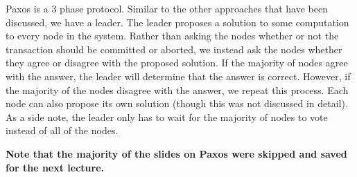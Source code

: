 \documentclass[twoside]{article}
\begin{document}
Paxos is a $3$ phase protocol. Similar to the other approaches that have been discussed, we have a leader. The leader proposes a solution to some computation to every node in the system. Rather than asking the nodes whether or not the transaction should be committed or aborted, we instead ask the nodes whether they agree or disagree with the proposed solution. If the majority of nodes agree with the answer, the leader will determine that the answer is correct. However, if the majority of the nodes disagree with the answer, we repeat this process. Each node can also propose its own solution (though this was not discussed in detail). As a side note, the leader only has to wait for the majority of nodes to vote instead of all of the nodes.

\textbf{Note that the majority of the slides on Paxos were skipped and saved for the next lecture.}
 
\end{document}

